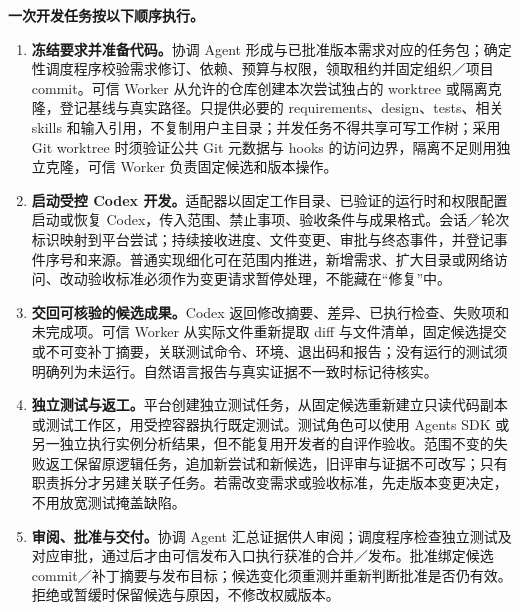 \documentclass[11pt,a4paper]{article}
\begin{document}
\textbf{一次开发任务按以下顺序执行。}
\begin{enumerate}[leftmargin=2em,itemsep=4pt]
  \item \textbf{冻结要求并准备代码。}协调 Agent 形成与已批准版本需求对应的任务包；确定性调度程序校验需求修订、依赖、预算与权限，领取租约并固定组织／项目 commit。可信 Worker 从允许的仓库创建本次尝试独占的 worktree 或隔离克隆，登记基线与真实路径。只提供必要的 requirements、design、tests、相关 skills 和输入引用，不复制用户主目录；并发任务不得共享可写工作树；采用 Git worktree 时须验证公共 Git 元数据与 hooks 的访问边界，隔离不足则用独立克隆，可信 Worker 负责固定候选和版本操作。
  \item \textbf{启动受控 Codex 开发。}适配器以固定工作目录、已验证的运行时和权限配置启动或恢复 Codex，传入范围、禁止事项、验收条件与成果格式。会话／轮次标识映射到平台尝试；持续接收进度、文件变更、审批与终态事件，并登记事件序号和来源。普通实现细化可在范围内推进，新增需求、扩大目录或网络访问、改动验收标准必须作为变更请求暂停处理，不能藏在“修复”中。
  \item \textbf{交回可核验的候选成果。}Codex 返回修改摘要、差异、已执行检查、失败项和未完成项。可信 Worker 从实际文件重新提取 diff 与文件清单，固定候选提交或不可变补丁摘要，关联测试命令、环境、退出码和报告；没有运行的测试须明确列为未运行。自然语言报告与真实证据不一致时标记待核实。
  \item \textbf{独立测试与返工。}平台创建独立测试任务，从固定候选重新建立只读代码副本或测试工作区，用受控容器执行既定测试。测试角色可以使用 Agents SDK 或另一独立执行实例分析结果，但不能复用开发者的自评作验收。范围不变的失败返工保留原逻辑任务，追加新尝试和新候选，旧评审与证据不可改写；只有职责拆分才另建关联子任务。若需改变需求或验收标准，先走版本变更决定，不用放宽测试掩盖缺陷。
  \item \textbf{审阅、批准与交付。}协调 Agent 汇总证据供人审阅；调度程序检查独立测试及对应审批，通过后才由可信发布入口执行获准的合并／发布。批准绑定候选 commit／补丁摘要与发布目标；候选变化须重测并重新判断批准是否仍有效。拒绝或暂缓时保留候选与原因，不修改权威版本。
\end{enumerate}
\end{document}
